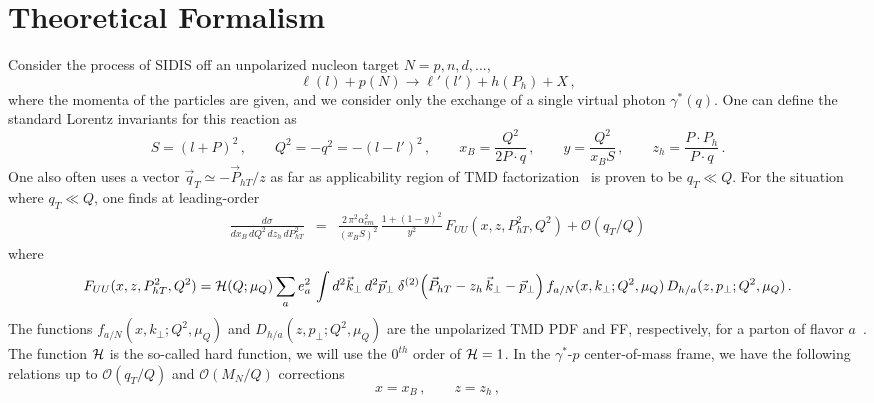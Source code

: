\documentclass[final,3p,times,onecolumn,sort&compress,hidelinks]{elsarticle}
\newcommand\3[1]{\boldsymbol{#1}}
\begin{document}
\section{Theoretical Formalism}
\label{s:model}
Consider the process of SIDIS off an unpolarized nucleon target $N=p,n,d,...$,
\begin{equation}
\ell(l)+p(N)\to \ell'(l') + h(P_h) + X\,,
\end{equation}
where the momenta of the particles are given, and we consider only the exchange of a single virtual photon $\gamma^*(q)$.  One can define the standard Lorentz invariants for this reaction as
\begin{equation}
S = (l+P)^2\,, \quad\quad Q^2 = -q^2 = -(l-l')^2\,, \quad\quad x_B = \frac{Q^2} {2P\cdot q}\,, \quad\quad y = \frac{Q^2} {x_B S}\,, \quad\quad z_h = \frac{P\cdot P_h} {P\cdot q}\,.
\end{equation}
One also often uses a vector $\vec{q}_T \simeq -\vec{P}_{hT}/z$ as far as applicability region of TMD factorization~\cite{Collins:2011zzd} is proven to be $q_T \ll Q$.
For the situation where $q_{T}\ll Q$, one finds at leading-order~\cite{Bacchetta:2006tn}
\begin{eqnarray}
\frac{d\sigma}
{dx_B\, dQ^2 \, dz_h \, dP_{hT}^2} &\!\!\!=\!\!\!&
\frac {2 \, \pi^2 \alpha_{em}^2}{(x_B S)^2} \, \frac{ 1 + (1-y)^2 }{y^2}\,F_{UU}(x,z,P_{hT}^2,Q^2) + \mathcal{O}(q_{T}/Q)
\label{e:dsigma}
\end{eqnarray}
where \cite{Collins:2011zzd}
\begin{equation}
F_{UU}(x,z,P_{hT}^2,Q^2)  = {\cal H} (Q; \mu_Q)\sum_{a} e_a^2 \,
\int d^2\vec{k}_\perp \, d^2\vec{p}_\perp
\> \delta ^{(2)}\Big(\vec{P}_{hT} - z_h\,\vec{k}_\perp -\vec{p}_\perp\Big)\,
f_{a/N} (x, k_{\perp}; Q^2, \mu_Q) \, D_{h/a}(z, p_{\perp}; Q^2, \mu_Q)\,. \label{e:FUU} \\
\end{equation}
The functions $f_{a/N} (x, k_{\perp}; Q^2, \mu_Q)$ and $D_{h/a}(z, p_{\perp}; Q^2, \mu_Q)$ are the unpolarized TMD PDF and FF, respectively, for a parton of flavor $a$~\cite{Bacchetta:2006tn,Collins:2011zzd}.  The function ${\cal H}$ is the so-called hard function, we will use the $0^{th}$ order of ${\cal H} = 1$. In the $\gamma^*$-$p$ center-of-mass frame, we have the following relations up to $\mathcal{O}(q_{T}/Q)$ and $\mathcal{O}(M_N/Q)$ corrections~\cite{Bacchetta:2006tn}
\begin{equation}
 x=x_B\,, \quad\quad z=z_h\,,\label{e:LT_relations}
\end{equation}
\end{document}
